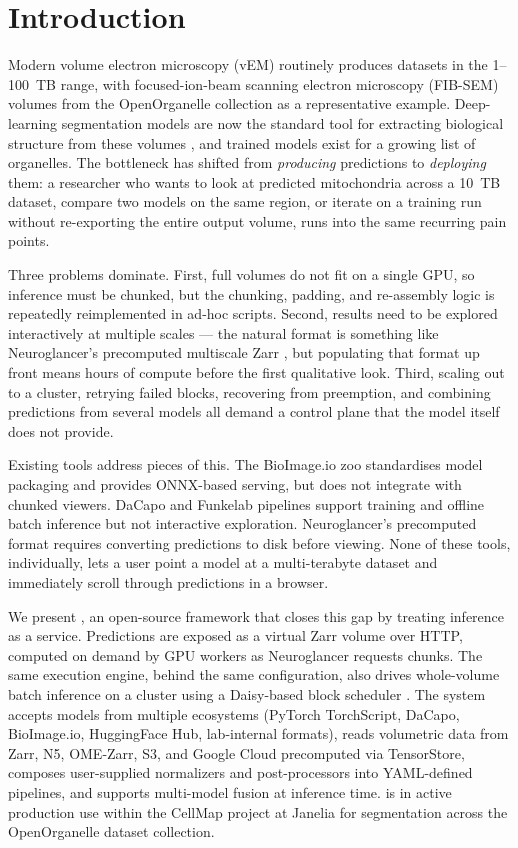 \section{Introduction}

Modern volume electron microscopy (vEM) routinely produces datasets in the 1--100~TB range, with focused-ion-beam scanning electron microscopy (FIB-SEM) volumes from the OpenOrganelle collection \cite{Xu2021} as a representative example. Deep-learning segmentation models are now the standard tool for extracting biological structure from these volumes \cite{Heinrich2021,Funke2018}, and trained models exist for a growing list of organelles. The bottleneck has shifted from \emph{producing} predictions to \emph{deploying} them: a researcher who wants to look at predicted mitochondria across a 10~TB dataset, compare two models on the same region, or iterate on a training run without re-exporting the entire output volume, runs into the same recurring pain points.

Three problems dominate. First, full volumes do not fit on a single GPU, so inference must be chunked, but the chunking, padding, and re-assembly logic is repeatedly reimplemented in ad-hoc scripts. Second, results need to be explored interactively at multiple scales --- the natural format is something like Neuroglancer's precomputed multiscale Zarr \cite{Neuroglancer}, but populating that format up front means hours of compute before the first qualitative look. Third, scaling out to a cluster, retrying failed blocks, recovering from preemption, and combining predictions from several models all demand a control plane that the model itself does not provide.

Existing tools address pieces of this. The BioImage.io zoo \cite{BioImageIO} standardises model packaging and provides ONNX-based serving, but does not integrate with chunked viewers. DaCapo \cite{Patton2024} and Funkelab pipelines support training and offline batch inference but not interactive exploration. Neuroglancer's precomputed format requires converting predictions to disk before viewing. None of these tools, individually, lets a user point a model at a multi-terabyte dataset and immediately scroll through predictions in a browser.

We present \cellmapflow{}, an open-source framework that closes this gap by treating inference as a service. Predictions are exposed as a virtual Zarr volume over HTTP, computed on demand by GPU workers as Neuroglancer requests chunks. The same execution engine, behind the same configuration, also drives whole-volume batch inference on a cluster using a Daisy-based block scheduler \cite{DaisyFunke}. The system accepts models from multiple ecosystems (PyTorch TorchScript, DaCapo, BioImage.io, HuggingFace Hub, lab-internal formats), reads volumetric data from Zarr, N5, OME-Zarr, S3, and Google Cloud precomputed via TensorStore, composes user-supplied normalizers and post-processors into YAML-defined pipelines, and supports multi-model fusion at inference time. \cellmapflow{} is in active production use within the CellMap project at Janelia for segmentation across the OpenOrganelle dataset collection.


